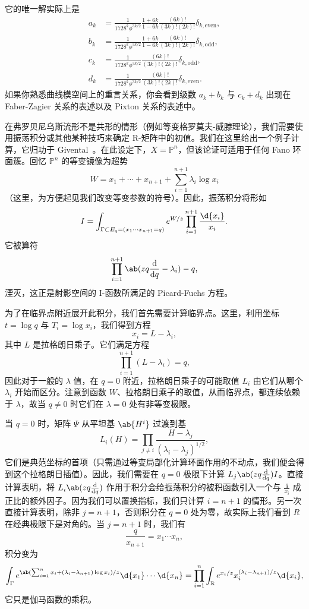 \documentclass{amsart}
\theoremstyle{definition}
\theoremstyle{remark}
\theoremstyle{plain}
\theoremstyle{definition}
\theoremstyle{remark}
\newcommand{\R}{\mathbb{R}}
\renewcommand{\P}{\mathbb{P}}
\newcommand{\1}{\mathbf{1}}
\newcommand{\2}{\mathbf{2}}
\newcommand{\3}{\mathbf{3}}
\begin{document}
它的唯一解实际上是
\begin{align*}
    a_k &= \frac{1}{1728^k \phi^{3k/2}} \frac{1+6k}{1-6k} \frac{(6k)!}{(3k)!(2k)!} \delta_{k, \text{even}},  \\
    b_k &= \frac{1}{1728^k \phi^{3k/2}} \frac{1+6k}{1-6k}\frac{(6k)!}{(3k)!(2k)!} \delta_{k, \text{odd}},  \\
    c_k &= \frac{1}{1728^k \phi^{3k/2}}\frac{(6k)!}{(3k)!(2k)!} \delta_{k, \text{odd}}, \\
    d_k &= \frac{1}{1728^k \phi^{3k/2}} \frac{(6k)!}{(3k)!(2k)!} \delta_{k, \text{even}}. 
\end{align*}
如果你熟悉曲线模空间上的重言关系，你会看到级数 \(a_k + b_k\) 与 \(c_k + d_k\) 出现在 Faber-Zagier 关系的表述以及 Pixton 关系的表述中。

在弗罗贝尼乌斯流形不是共形的情形（例如等变格罗莫夫-威滕理论），我们需要使用振荡积分或其他某种技巧来确定 R-矩阵中的初值。我们在这里给出一个例子计算，它归功于 Givental~\cite{Givental2001semisimple}。在此设定下，\(X = \P^n\)，但该论证可适用于任何 Fano 环面簇。回忆 \(\P^n\) 的等变镜像为超势
\[ W = x_1 + \cdots + x_{n+1} + \sum_{i=1}^{n+1} \lambda_i \log x_i \]
（这里，为方便起见我们改变等变参数的符号）。因此，振荡积分将形如
\[ I = \int_{\Gamma \subset E_q = (x_1 \cdots x_{n+1}=q)} e^{W/z} \prod_{i=1}^{n+1} \frac{\d{x_i}}{x_i}. \]
它被算符
\[ \prod_{i=1}^{n+1}\ab(zq \odv{}{q} -\lambda_i) - q, \]
湮灭，这正是射影空间的 I-函数所满足的 Picard-Fuchs 方程。

为了在临界点附近展开此积分，我们首先需要计算临界点。这里，利用坐标 \(t = \log q\) 与 \(T_i = \log x_i\)，我们得到方程
\[ x_i = L - \lambda_i, \]
其中 \(L\) 是拉格朗日乘子。它们满足方程
\[ \prod_{i=1}^{n+1} (L - \lambda_i) = q, \]
因此对于一般的 \(\lambda\) 值，在 \(q = 0\) 附近，拉格朗日乘子的可能取值 \(L_i\) 由它们从哪个 \(\lambda_i\) 开始而区分。注意到函数 \(W\)、拉格朗日乘子的取值，从而临界点，都连续依赖于 \(\lambda\)，故当 \(q \neq 0\) 时它们在 \(\lambda = 0\) 处有非等变极限。

当 \(q = 0\) 时，矩阵 \(\Psi\) 从平坦基 \(\ab{H^i}\) 过渡到基
\[ L_i(H) = \prod_{j \neq i} \frac{H - \lambda_j}{(\lambda_i - \lambda_j)^{1/2}}, \]
它们是典范坐标的首项（只需通过等变局部化计算环面作用的不动点，我们便会得到这个拉格朗日插值）。因此，我们需要在 \(q = 0\) 极限下计算 \(L_j \ab(z q \odv{}{q}) I\)。直接计算表明，将 \(L_i \ab(z q \odv{}{q})\) 作用于积分会给振荡积分的被积函数引入一个与 \(\frac{q}{x_i}\) 成正比的额外因子。因为我们可以置换指标，我们只计算 \(i = n+1\) 的情形。另一次直接计算表明，除非 \(j = n+1\)，否则积分在 \(q = 0\) 处为零，故实际上我们看到 \(R\) 在经典极限下是对角的。当 \(j = n+1\) 时，我们有
\[ \frac{q}{x_{n+1}} = x_1 \cdots x_n, \]
积分变为
\[ \int_{\Gamma} e^{\ab( \sum_{i=1}^n x_i + (\lambda_i - \lambda_{n+1})\log x_i ) / z} \d{x_1} \cdots \d{x_n} = \prod_{i=1}^n \int_{\R} e^{x_i/z} x_i^{(\lambda_i - \lambda_{n+1})/z} \d{x_i}, \]
它只是伽马函数的乘积。
\end{document}
